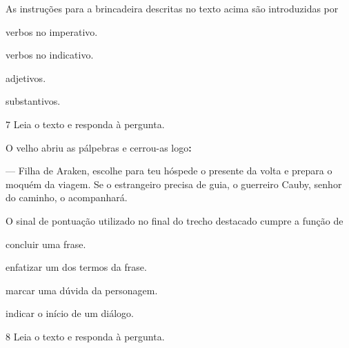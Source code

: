As instruções para a brincadeira descritas no texto acima são
introduzidas por

\begin{escolha}
  \item verbos no imperativo.

  \item verbos no indicativo.

  \item adjetivos.

  \item substantivos.
\end{escolha}


\num{7} Leia o texto e responda à pergunta.

\begin{myquote}
\textit{}

O velho abriu as pálpebras e cerrou-as logo\textbf{:}

--- Filha de Araken, escolhe para teu hóspede o presente da volta e
prepara o moquém da viagem. Se o estrangeiro precisa de guia, o
guerreiro Cauby, senhor do caminho, o acompanhará.

\end{myquote}

O sinal de pontuação utilizado no final do trecho destacado cumpre a
função de

\begin{escolha}
  \item concluir uma frase.

  \item enfatizar um dos termos da frase.

  \item marcar uma dúvida da personagem.

  \item indicar o início de um diálogo.
\end{escolha}

\num{8} Leia o texto e responda à pergunta.

